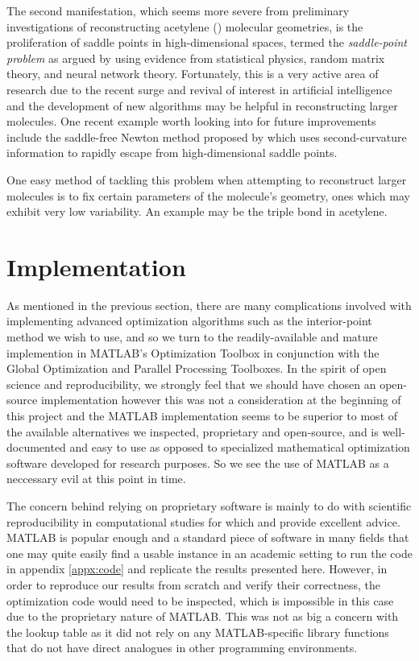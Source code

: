 The second manifestation, which seems more severe from preliminary investigations of reconstructing acetylene () molecular geometries, is the proliferation of saddle points in high-dimensional spaces, termed the \emph{saddle-point problem} as argued by \citet{Pascanu14} using evidence from statistical physics, random matrix theory, and neural network theory. Fortunately, this is a very active area of research due to the recent surge and revival of interest in artificial intelligence \citep{Bengio16,LeCun15} and the development of new algorithms may be helpful in reconstructing larger molecules. One recent example worth looking into for future improvements include the saddle-free Newton method proposed by \citet{Dauphin14} which uses second-curvature information to rapidly escape from high-dimensional saddle points.

One easy method of tackling this problem when attempting to reconstruct larger molecules is to fix certain parameters of the molecule's geometry, ones which may exhibit very low variability. An example may be the triple  bond in acetylene.

\section{Implementation} \label{sec:optImplementation}
As mentioned in the previous section, there are many complications involved with implementing advanced optimization algorithms such as the interior-point method we wish to use, and so we turn to the readily-available and mature implemention in MATLAB's Optimization Toolbox in conjunction with the Global Optimization and Parallel Processing Toolboxes. In the spirit of open science and reproducibility, we strongly feel that we should have chosen an open-source implementation however this was not a consideration at the beginning of this project and the MATLAB implementation seems to be superior to most of the available alternatives we inspected, proprietary and open-source, and is well-documented and easy to use as opposed to specialized mathematical optimization software developed for research purposes. So we see the use of MATLAB as a neccessary evil at this point in time.

The concern behind relying on proprietary software is mainly to do with scientific reproducibility in computational studies \citep{Easterbrook14} for which \citet{Millman14} and \citet{Wilson14} provide excellent advice. MATLAB is popular enough and a standard piece of software in many fields that one may quite easily find a usable instance in an academic setting to run the code in appendix \ref{appx:code} and replicate the results presented here. However, in order to reproduce our results from scratch and verify their correctness, the optimization code would need to be inspected, which is impossible in this case due to the proprietary nature of MATLAB. This was not as big a concern with the lookup table as it did not rely on any MATLAB-specific library functions that do not have direct analogues in other programming environments.

